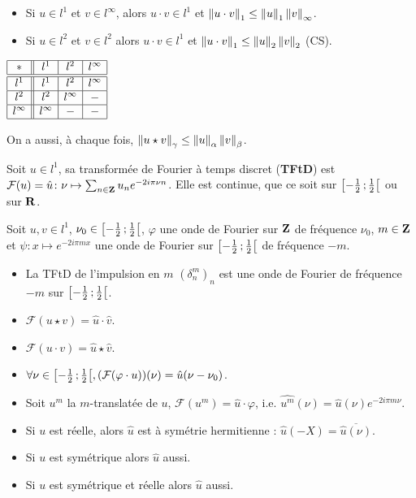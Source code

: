 \begin{pop}
	\begin{itemize}
	\item Si $u \in l^1$ et $v \in l^\infty$, alors $u \cdot v \in l^1$ et $\left\lVert u \cdot v\right\rVert_1 \leq \left\lVert u\right\rVert_1 \left\lVert v\right\rVert_\infty$.
	\item Si $u \in l^2$ et $v \in l^2$ alors $u \cdot v \in l^1$ et $\left\lVert u \cdot v\right\rVert_1 \leq \left\lVert u\right\rVert_2 \left\lVert v\right\rVert_2$ (CS).
	\end{itemize}
\end{pop}

\begin{pop}
	$\begin{array}{|c||c|c|c|}
		\hline
		* & l^1 & l^2 & l^\infty \\ \hline \hline
		l^1 & l^1 & l^2 & l^\infty \\ \hline
		l^2 & l^2 & l^\infty & - \\ \hline
		l^\infty & l^\infty & - & - \\ \hline
	\end{array}$
	
	On a aussi, à chaque fois, $\left\lVert u \star v\right\rVert_\gamma \leq \left\lVert u\right\rVert_\alpha \left\lVert v\right\rVert_\beta$.
\end{pop}

\begin{defn}
	Soit $u \in l^1$, sa transformée de Fourier à temps discret (\textbf{TFtD}) est $\mathcal{F}(u) = \hat{u} \colon \nu \mapsto \sum_{n \in \mathbf{Z}} u_n e^{-2i\pi \nu n}$.
	Elle est continue, que ce soit sur $\mathopen{}\mathclose{\left[-\frac{1}{2}\mathclose{}\mathpunct{};\frac{1}{2}\right[}$ ou sur $\mathbf{R}$.
\end{defn}

\begin{pop}
	Soit $u,v \in l^1$, $\nu_0 \in \mathopen{}\mathclose{\left[-\frac{1}{2}\mathclose{}\mathpunct{};\frac{1}{2}\right[}$, $\varphi$ une onde de Fourier sur $\mathbf{Z}$ de fréquence $\nu_0$, $m \in \mathbf{Z}$ et $\psi \colon x \mapsto e^{-2i\pi mx}$ une onde de Fourier sur $\mathopen{}\mathclose{\left[-\frac{1}{2}\mathclose{}\mathpunct{};\frac{1}{2}\right[}$ de fréquence $-m$.
	\begin{itemize}
		\item La TFtD de l'impulsion en $m$ $(\delta_n^m)_n$ est une onde de Fourier de fréquence $-m$ sur $\mathopen{}\mathclose{\left[-\frac{1}{2}\mathclose{}\mathpunct{};\frac{1}{2}\right[}$.
		\item $\mathcal{F}(u \star v) = \hat{u} \cdot \hat{v}$.
		\item $\mathcal{F}(u \cdot v) = \hat{u} \star \hat{v}$.
		\item $\forall \nu \in \mathopen{}\mathclose{\left[-\frac{1}{2}\mathclose{}\mathpunct{};\frac{1}{2}\right[}, (\mathcal{F}(\varphi \cdot u))(\nu) = \hat{u}(\nu - \nu_0)$.
		\item Soit $u^m$ la $m$-translatée de $u$, $\mathcal{F} \left( u^m \right) = \hat{u} \cdot \varphi$, i.e. $\hat{u^m}(\nu) = \hat{u}(\nu) e^{-2i\pi m \nu}$.
		\item Si $u$ est réelle, alors $\hat{u}$ est à symétrie hermitienne : $\hat{u}(-X) = \overline{\hat{u}(\nu)}$.
		\item Si $u$ est symétrique alors $\hat{u}$ aussi.
		\item Si $u$ est symétrique et réelle alors $\hat{u}$ aussi.
	\end{itemize}
\end{pop}

